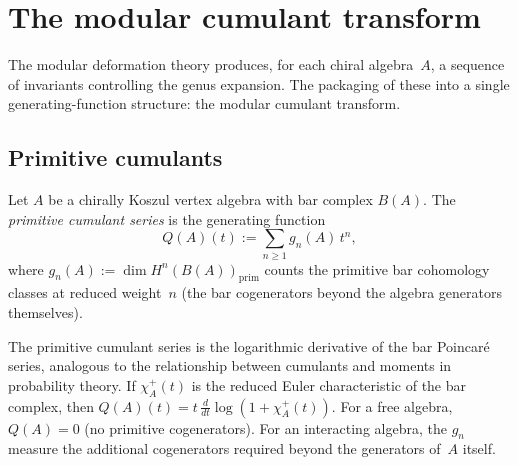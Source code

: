 
\section{The modular cumulant transform}

The modular deformation theory produces, for each chiral algebra~$A$, a
sequence of invariants controlling the genus expansion. The packaging of
these into a single generating-function structure: the modular cumulant
transform.

\subsection{Primitive cumulants}

\begin{definition}
Let $A$ be a chirally Koszul vertex algebra with bar complex $B(A)$.
The \emph{primitive cumulant series} is the generating function
\begin{equation}%
Q(A)(t) := \sum_{n \ge 1} g_n(A)\, t^n,
\end{equation}
where $g_n(A) := \dim H^n(B(A))_{\mathrm{prim}}$ counts the primitive
bar cohomology classes at reduced weight~$n$
(the bar cogenerators beyond the algebra generators themselves).
\end{definition}

\begin{remark}
The primitive cumulant series is the logarithmic derivative of the
bar Poincar\'e series, analogous to the relationship between cumulants
and moments in probability theory. If $\chi_A^+(t)$ is the reduced
Euler characteristic of the bar complex, then
$Q(A)(t) = t\,\frac{d}{dt}\log(1 + \chi_A^+(t))$.
For a free algebra, $Q(A) = 0$ (no primitive cogenerators).
For an interacting algebra, the $g_n$ measure the additional
cogenerators required beyond the generators of~$A$ itself.
\end{remark}

